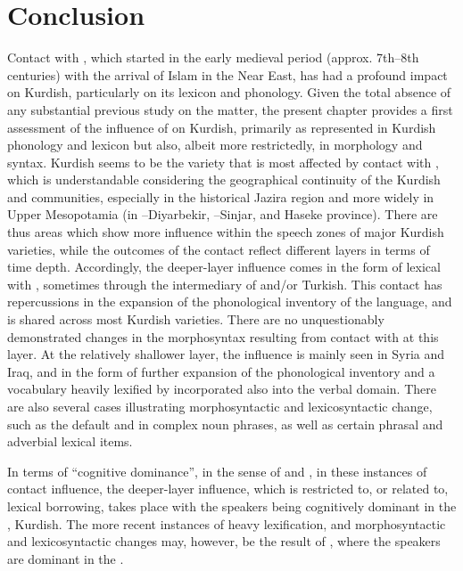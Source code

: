 \documentclass[output=paper]{langsci/langscibook}
\begin{document}
\section{Conclusion}
Contact with , which started in the early medieval period (approx. 7th–8th centuries) with the arrival of Islam in the Near East, has had a profound impact on Kurdish, particularly on its lexicon and phonology. Given the total absence of any substantial previous study on the matter, the present chapter provides a first assessment of the influence of  on Kurdish, primarily as represented in Kurdish phonology and lexicon but also, albeit more restrictedly, in morphology and syntax.  Kurdish seems to be the variety that is most affected by contact with , which is understandable considering the geographical continuity of the Kurdish and  communities, especially in the historical Jazira region and more widely in Upper Mesopotamia (in –Diyarbekir, –Sinjar, and Haseke province). There are thus areas which show more   influence within the speech zones of major Kurdish varieties, while the outcomes of the contact reflect different layers in terms of time depth. Accordingly, the deeper-layer influence comes in the form of lexical  with , sometimes through the intermediary of  and/or  {Turkish}. This contact has repercussions in the expansion of the phonological inventory of the language, and is shared across most Kurdish varieties. There are no unquestionably demonstrated changes in the morphosyntax resulting from contact with  at this layer. At the relatively shallower layer, the influence is mainly seen in Syria and Iraq, and in the form of further expansion of the phonological inventory and a vocabulary heavily lexified by   incorporated also into the verbal domain. There are also several cases illustrating morphosyntactic and lexicosyntactic change, such as the default  and  in complex noun phrases, as well as certain phrasal and adverbial lexical items. 

In terms of “cognitive dominance”, in the sense of \citet{VanCoetsem1988,VanCoetsem2000} and \citet{Lucas2015}, in these instances of contact influence, the deeper-layer influence, which is restricted to, or related to, lexical borrowing, takes place with the speakers being cognitively dominant in the , Kurdish. The more recent instances of heavy lexification, and morphosyntactic and lexicosyntactic changes may, however, be the result of , where the speakers are dominant in the . 
\end{document}
